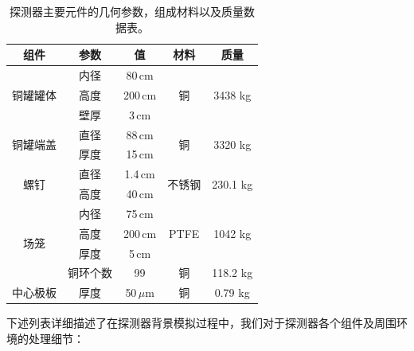 \begin{table}[thb]
    \begin{center}
        \begin{tabular*}{0.75\textwidth}{@{\extracolsep{\fill}}ccccc}
        \hline
        \hline
        \textbf{组件} & \textbf{参数} & \textbf{值} & \textbf{材料} & \textbf{质量} \\ \hline
        \multirow{3}{*}{铜罐罐体} 
            & 内径 & 80\,cm & \multirow{3}{*}{铜} & \multirow{3}{*}{3438 kg} \\
            & 高度 & 200\,cm &  &    \\   
            & 壁厚 & 3\,cm &  &    \\\hline
        \multirow{2}{*}{铜罐端盖} 
            & 直径 & 88\,cm & \multirow{2}{*}{铜} & \multirow{2}{*}{3320 kg} \\
            & 厚度 & 15\,cm &  &    \\\hline
        \multirow{2}{*}{螺钉} 
            & 直径 & 1.4\,cm & \multirow{2}{*}{不锈钢} & \multirow{2}{*}{230.1 kg} \\
            & 高度 & 40\,cm &  &    \\\hline
        \multirow{4}{*}{场笼} 
            & 内径 & 75\,cm & \multirow{3}{*}{PTFE} & \multirow{3}{*}{1042 kg} \\
            & 高度 & 200\,cm &  & \\ 
            & 厚度 & 5\,cm &  & \\ 
            & 铜环个数 & 99 &    \multirow{1}{*}{铜}  & 118.2 kg \\\hline
        中心极板 
            & 厚度   &   50\,$\mu$m     &   \multirow{1}{*}{铜}  &    0.79 kg   \\   
        \hline
        \hline
        \end{tabular*}
        \caption{探测器主要元件的几何参数，组成材料以及质量数据表。\supercite{cdr}}
        \label{tab:parameters_geometry}
    \end{center}
\end{table}
  
下述列表详细描述了在探测器背景模拟过程中，我们对于探测器各个组件及周围环境的处理细节：
\vspace{0.4cm}


